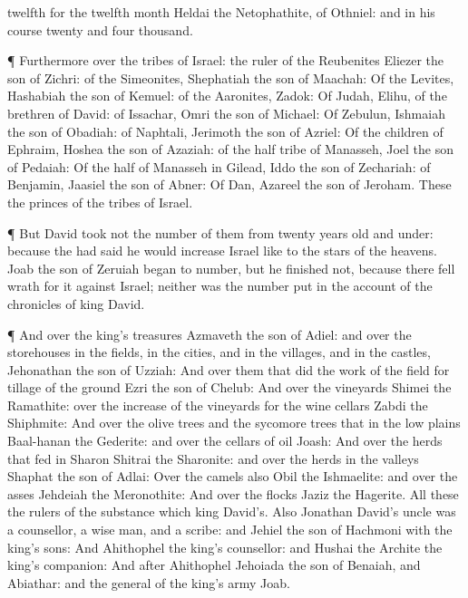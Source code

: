 {twelfth
{} for the
twelfth
month
{}
Heldai the
Netophathite, of
Othniel: and in his
course
{}
twenty and
four
thousand.
\par }{\PP {}¶ Furthermore over the
tribes of
Israel: the
ruler of the
Reubenites
{}
Eliezer the
son of
Zichri: of the
Simeonites,
Shephatiah the
son of
Maachah:
Of the
Levites,
Hashabiah the
son of
Kemuel: of the
Aaronites,
Zadok:
Of
Judah,
Elihu,
{} of the
brethren of
David: of
Issachar,
Omri the
son of
Michael:
Of
Zebulun,
Ishmaiah the
son of
Obadiah: of
Naphtali,
Jerimoth the
son of
Azriel:
Of the
children of
Ephraim,
Hoshea the
son of
Azaziah: of the
half
tribe of
Manasseh,
Joel the
son of
Pedaiah:
Of the
half
{} of
Manasseh in
Gilead,
Iddo the
son of
Zechariah: of
Benjamin,
Jaasiel the
son of
Abner:
Of
Dan,
Azareel the
son of
Jeroham. These
{} the
princes of the
tribes of
Israel.
\par }{\PP {}¶ But
David
took not the
number of them from
twenty
years
old and
under: because the
{} had
said he would
increase
Israel like to the
stars of the
heavens.
Joab the
son of
Zeruiah
began to
number, but he
finished not, because there fell
wrath for
it against
Israel; neither was the
number
put in the
account of the
chronicles of
king
David.
\par }{\PP {}¶ And over the
king’s
treasures
{}
Azmaveth the
son of
Adiel: and over the
storehouses in the
fields, in the
cities, and in the
villages, and in the
castles,
{}
Jehonathan the
son of
Uzziah:
And over them that
did the
work of the
field for
tillage of the
ground
{}
Ezri the
son of
Chelub:
And over the
vineyards
{}
Shimei the
Ramathite: over the increase of the
vineyards for the
wine
cellars
{}
Zabdi the
Shiphmite:
And over the olive
trees and the sycomore
trees that
{} in the low
plains
{}
Baal-hanan the
Gederite: and over the
cellars of
oil
{}
Joash:
And over the
herds that
fed in
Sharon
{}
Shitrai the
Sharonite: and over the
herds
{} in the
valleys
{}
Shaphat the
son of
Adlai:
Over the
camels also
{}
Obil the
Ishmaelite: and over the
asses
{}
Jehdeiah the
Meronothite:
And over the
flocks
{}
Jaziz the
Hagerite. All these
{} the
rulers of the
substance which
{}
king
David’s.
Also
Jonathan
David’s
uncle was a
counsellor, a
wise
man, and a
scribe: and
Jehiel the
son of
Hachmoni
{} with the
king’s
sons:
And
Ahithophel
{} the
king’s
counsellor: and
Hushai the
Archite
{} the
king’s
companion:
And
after
Ahithophel
{}
Jehoiada the
son of
Benaiah, and
Abiathar: and the
general of the
king’s
army
{}
Joab.

}
